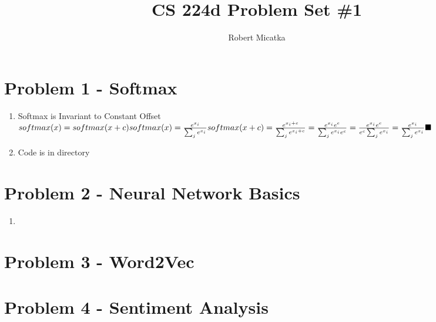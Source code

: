 \documentclass{article}
\begin{document}
\title{CS 224d Problem Set \#1}
\author{Robert Micatka}

\maketitle

\section{Problem 1 - Softmax}

\begin{enumerate}[label=(\alph*)]

\item Softmax is Invariant to Constant Offset
	$softmax(x) = softmax(x + c) \\
	softmax(x) = \frac{e^{x_i}}{\sum_j e^{x_i}} \\
	softmax(x + c) = \frac{e^{x_i + c}}{\sum_j e^{x_i + c}} = 
	\frac{e^{x_i} e^{c}}{\sum_j e^{x_i} e^{c}} = 
	\frac{e^{x_i} e^{c}}{e^{c} \sum_j {e^{x_i}}} = \frac{e^{x_i}}{\sum_j e^{x_i}} \blacksquare
	$
	
\item Code is in directory

\end{enumerate}

\section{Problem 2 - Neural Network Basics}

\begin{enumerate}[label=(\alph*)]

\item 

\end{enumerate}

\section{Problem 3 - Word2Vec}

\section{Problem 4 - Sentiment Analysis}
\end{document}
